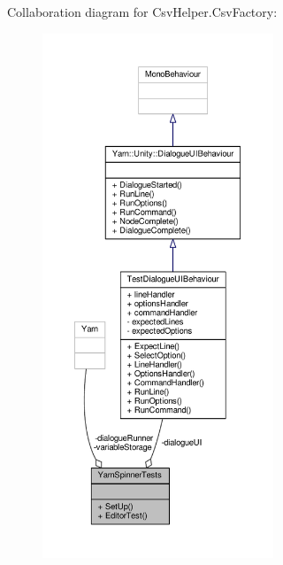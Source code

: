 Collaboration diagram for Csv\-Helper.\-Csv\-Factory\-:
\nopagebreak
\begin{figure}[H]
\begin{center}
\leavevmode
\includegraphics[width=196pt]{a00405}
\end{center}
\end{figure}
